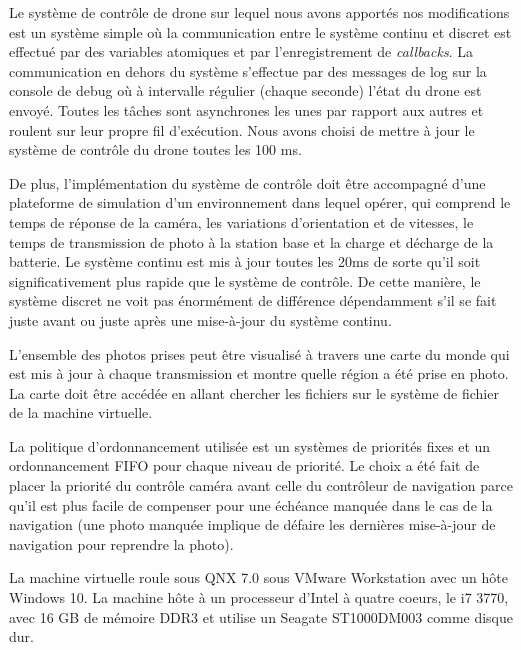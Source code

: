 \documentclass[journal]{IEEEtran}
\begin{document}
Le système de contrôle de drone sur lequel nous avons apportés nos modifications est un système simple où la communication entre le système continu et discret est effectué par des variables atomiques et par l'enregistrement de \textit{callbacks}. La communication en dehors du système s'effectue par des messages de log sur la console de debug où à intervalle régulier (chaque seconde) l'état du drone est envoyé. Toutes les tâches sont asynchrones les unes par rapport aux autres et roulent sur leur propre fil d'exécution. Nous avons choisi de mettre à jour le système de contrôle du drone toutes les 100 ms.

De plus, l'implémentation du système de contrôle doit être accompagné d'une plateforme de simulation d'un environnement dans lequel opérer, qui comprend le temps de réponse de la caméra, les variations d'orientation et de vitesses, le temps de transmission de photo à la station base et la charge et décharge de la batterie. Le système continu est mis à jour toutes les 20ms de sorte qu'il soit significativement plus rapide que le système de contrôle. De cette manière, le système discret ne voit pas énormément de différence dépendamment s'il se fait juste avant ou juste après une mise-à-jour du système continu.

L'ensemble des photos prises peut être visualisé à travers une carte du monde qui est mis à jour à chaque transmission et montre quelle région a été prise en photo. La carte doit être accédée en allant chercher les fichiers sur le système de fichier de la machine virtuelle.

La politique d'ordonnancement utilisée est un systèmes de priorités fixes et un ordonnancement FIFO pour chaque niveau de priorité. Le choix a été fait de placer la priorité du contrôle caméra avant celle du contrôleur de navigation parce qu'il est plus facile de compenser pour une échéance manquée dans le cas de la navigation (une photo manquée implique de défaire les dernières mise-à-jour de navigation pour reprendre la photo).

La machine virtuelle roule sous QNX 7.0 sous VMware Workstation avec un hôte Windows 10. La machine hôte à un processeur d'Intel à quatre coeurs, le i7 3770, avec 16 GB de mémoire DDR3 et utilise un Seagate ST1000DM003 comme disque dur. 
\end{document}
